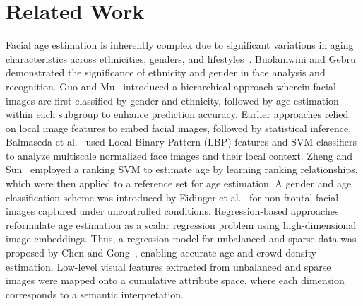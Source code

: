 \section{Related Work}
Facial age estimation is inherently complex due to significant variations in
aging characteristics across ethnicities, genders, and
lifestyles~\cite{han2013age}. Buolamwini and Gebru~\cite{Gebru} demonstrated
the significance of ethnicity and gender in face analysis and recognition. Guo
and Mu~\cite{guo2010human} introduced a hierarchical approach wherein facial
images are first classified by gender and ethnicity, followed by age
estimation within each subgroup to enhance prediction accuracy. Earlier
approaches relied on local image features to embed facial images, followed by
statistical inference. Balmaseda et al.~\cite{ramon2012gender} used Local
Binary Pattern (LBP) features and SVM classifiers to analyze multiscale
normalized face images and their local context. Zheng and
Sun~\cite{ZhengSun2012} employed a ranking SVM to estimate age by learning
ranking relationships, which were then applied to a reference set for age
estimation. A gender and age classification scheme was introduced by Eidinger
et al.~\cite{eidinger2014age} for non-frontal facial images captured under
uncontrolled conditions. Regression-based approaches reformulate age
estimation as a scalar regression problem using high-dimensional image
embeddings. Thus, a regression model for unbalanced and sparse data was
proposed by Chen and Gong~\cite{ChenGong2013}, enabling accurate age and crowd
density estimation. Low-level visual features extracted from unbalanced and
sparse images were mapped onto a cumulative attribute space, where each
dimension corresponds to a semantic interpretation.

